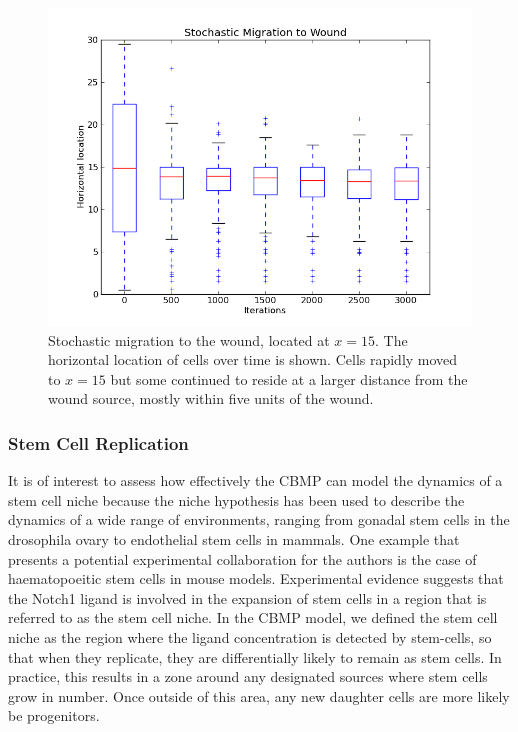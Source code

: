 \documentclass[12pt]{article}
\begin{document}
\begin{figure}[H]
\centering
\includegraphics[width=11.51cm]{media/StochMigrationtoWound.png}
\caption{Stochastic migration to the wound, located at \(x=15\). The horizontal location
  of cells over time is shown. Cells rapidly moved to \(x=15\) but some continued to reside
  at a larger distance from the wound source, mostly within five units of the wound.
}
\end{figure}

\subsubsection{Stem Cell Replication}
It is of interest to assess how effectively the CBMP can model the 
dynamics of a stem cell niche because the niche hypothesis has been used 
to describe the dynamics of a wide range of environments, ranging from 
gonadal stem cells in the drosophila ovary to endothelial stem cells in 
mammals.\cite{linheng05} One example that presents a potential experimental 
collaboration for the authors is the case of haematopoeitic stem cells in 
mouse models. Experimental evidence suggests that the Notch1 ligand is 
involved in the expansion of stem cells in a region that is referred to 
as the stem cell niche.\cite{calvi03} In the CBMP model, we defined the stem cell 
niche as the region where the ligand concentration is detected by stem-cells,
so that when they replicate, they are differentially likely to remain as
stem cells. In practice, this 
results in a zone around any designated sources where stem cells grow in 
number. Once outside of this area, any new daughter cells are more 
likely be progenitors. 
\end{document}
